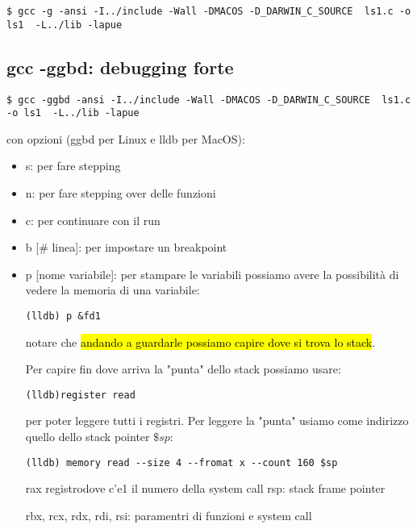 \begin{lstlisting}
$ gcc -g -ansi -I../include -Wall -DMACOS -D_DARWIN_C_SOURCE  ls1.c -o ls1  -L../lib -lapue
\end{lstlisting}


\subsection{gcc -ggbd: debugging forte}

\begin{lstlisting}
$ gcc -ggbd -ansi -I../include -Wall -DMACOS -D_DARWIN_C_SOURCE  ls1.c -o ls1  -L../lib -lapue
\end{lstlisting}

con opzioni (ggbd per Linux e lldb per MacOS):
\begin{itemize}
    \item s: per fare stepping
    \item n: per fare stepping over delle funzioni
    \item c: per continuare con il run
    \item b [\# linea]: per impostare un breakpoint
    \item p [nome variabile]: per stampare le variabili
        possiamo avere la possibilità di vedere la memoria di una variabile: 

\begin{lstlisting}
(lldb) p &fd1
\end{lstlisting}

        notare che \hl{andando a guardarle possiamo capire dove si trova lo stack}. 

        Per capire fin dove arriva la "punta" dello stack possiamo usare:

\begin{lstlisting}
(lldb)register read
\end{lstlisting}

        per poter leggere tutti i registri. Per leggere la "punta" usiamo come indirizzo quello dello stack pointer $\$sp$:

\begin{lstlisting}
(lldb) memory read --size 4 --fromat x --count 160 $sp
\end{lstlisting}

        rax registrodove c'e1 il numero della system call
        rsp: stack frame pointer

        rbx, rcx, rdx, rdi, rsi: paramentri di funzioni e system call 


\end{itemize}
